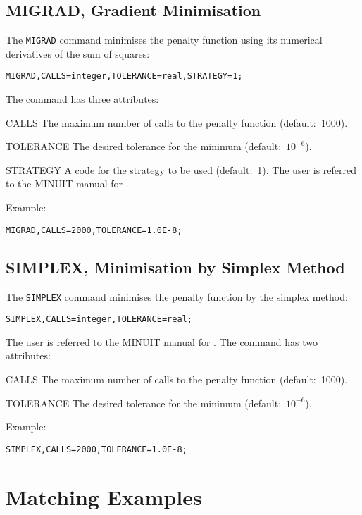\subsection{MIGRAD, Gradient Minimisation}
The \texttt{MIGRAD} command minimises the penalty
function using its numerical derivatives of the sum of squares:
\begin{verbatim}
MIGRAD,CALLS=integer,TOLERANCE=real,STRATEGY=1;
\end{verbatim}
The command has three attributes:
\begin{description}
\item{CALLS}
  The maximum number of calls to the penalty function (default:~1000).
\item{TOLERANCE}
  The desired tolerance for the minimum (default:~\(10^{-6}\)).
\item{STRATEGY}
  A code for the strategy to be used (default:~1).
  The user is referred to the MINUIT manual for
  . 
\end{description}
Example:
\begin{verbatim}
MIGRAD,CALLS=2000,TOLERANCE=1.0E-8;
\end{verbatim}

\subsection{SIMPLEX, Minimisation by Simplex Method}
The \texttt{SIMPLEX} command minimises the penalty
function by the simplex method:
\begin{verbatim}
SIMPLEX,CALLS=integer,TOLERANCE=real;
\end{verbatim}
The user is referred to the MINUIT manual for
. 
The command has two attributes:
\begin{description}
\item{CALLS}
  The maximum number of calls to the penalty function (default:~1000).
\item{TOLERANCE}
  The desired tolerance for the minimum (default:~\(10^{-6}\)).
\end{description}
Example:
\begin{verbatim}
SIMPLEX,CALLS=2000,TOLERANCE=1.0E-8;
\end{verbatim}

\section{Matching Examples}

